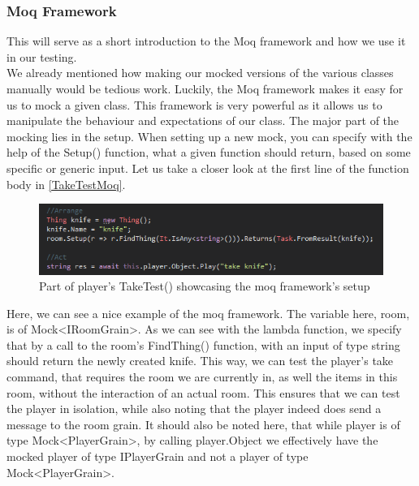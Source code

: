 \subsubsection{Moq Framework}
This will serve as a short introduction to the Moq framework and how we use it in our testing. \\
We already mentioned how making our mocked versions of the various classes manually would be tedious work. Luckily, the Moq framework makes it easy for us to mock a given class. This framework is very powerful as it allows us to manipulate the behaviour and expectations of our class\cite{TestingAdaptiveCode}. The major part of the mocking lies in the setup. When setting up a new mock, you can specify with the help of the Setup() function, what a given function should return, based on some specific or generic input. Let us take a closer look at the first line of the function body in \autoref{TakeTestMoq}. 
\begin{figure}
    \centering
    \includegraphics[width=0.9\linewidth]{Materials/TestingTheory/testTakeTestMoqExample}
    \caption{Part of player's TakeTest() showcasing the moq framework's setup}
    \label{TakeTestMoq}
\end{figure}
Here, we can see a nice example of the moq framework. The variable here, room, is of Mock<IRoomGrain>. As we can see with the lambda function, we specify that by a call to the room's FindThing() function, with an input of type string should return the newly created knife. This way, we can test the player's take command, that requires the room we are currently in, as well the items in this room, without the interaction of an actual room. This ensures that we can test the player in isolation, while also noting that the player indeed does send a message to the room grain. It should also be noted here, that while player is of type Mock<PlayerGrain>, by calling player.Object we effectively have the mocked player of type IPlayerGrain and not a player of type Mock<PlayerGrain>.

